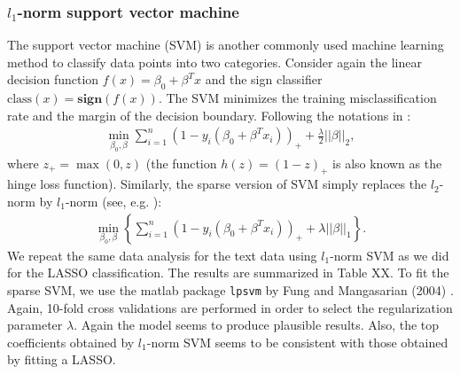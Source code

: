 \documentclass[11pt]{article}
\newcommand{\1}[1]{{\mathbf 1}\left\{#1\right\}}        %
\begin{document}
\subsubsection{$l_1$-norm support vector machine}
The support vector machine (SVM) is another commonly used machine learning method to classify data points into two categories. Consider again the linear decision function $f(x) = \beta_0 + \beta^T x$ and the sign classifier $\text{class}(x) = \textbf{sign} (f(x))$. The SVM minimizes the training misclassification rate and the margin of the decision boundary. Following the notations in \cite{HastieSVM}:
\begin{align}
\label{eq:l2svm}
\min_{\beta_0,\beta} \sum_{i=1}^n(1-y_i(\beta_0+\beta^Tx_i))_+ + \frac{\lambda}{2} ||\beta||_2,
\end{align}
where $z_+ = \max(0,z)$ (the function $h(z) = (1-z)_+$ is also known as the hinge loss function). Similarly, the sparse version of SVM simply replaces the $l_2$-norm by $l_1$-norm (see, e.g. \cite{ZhuSVM}):
\begin{align*}
\label{eq:l1svm}
\min_{\beta_0,\beta} \left\{ \sum_{i=1}^n(1-y_i(\beta_0+\beta^Tx_i))_+ + \lambda ||\beta||_1\right\}. 
\end{align*}
We repeat the same data analysis for the text data using $l_1$-norm SVM as we did for the LASSO classification. The results are summarized in Table XX. To fit the sparse SVM, we use the matlab package {\tt lpsvm} by Fung and Mangasarian (2004) \cite{Fung}. Again, 10-fold cross validations are performed in order to select the regularization parameter $\lambda$. Again the model seems to produce plausible results. Also, the top coefficients obtained by $l_1$-norm SVM seems to be consistent with those obtained by fitting a LASSO.  
%
\end{document}
